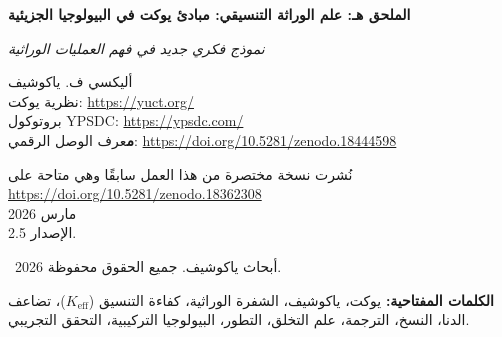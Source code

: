 \documentclass[11pt,a4paper]{article}
\begin{document}
	
	\begin{titlepage}
		\begin{center}
			\vspace*{0cm}
			
			\Huge\textbf{الملحق هـ: علم الوراثة التنسيقي: مبادئ يوكت في البيولوجيا الجزيئية}
			
			\vspace{1cm}
			
			\small\textit{نموذج فكري جديد في فهم العمليات الوراثية}
			
			\vspace{1cm}
			\Large
			أليكسي ف. ياكوشيف\\
			
			نظرية يوكت: \url{https://yuct.org/}\\
			بروتوكول YPSDC: \url{https://ypsdc.com/}\\
			
			\vspace{2cm}
			\textbf معرف الوصل الرقمي: \url{https://doi.org/10.5281/zenodo.18444598}\\
			
			\vspace{1cm}
			
			\large 
			نُشرت نسخة مختصرة من هذا العمل سابقًا وهي متاحة على\\ \url{https://doi.org/10.5281/zenodo.18362308}\\
			\vspace{1cm}
			مارس 2026 \\ \large الإصدار 2.5.
			
			\vspace{4cm}
			\textcopyright~2026 أبحاث ياكوشيف. جميع الحقوق محفوظة.
			
			\newpage	
			\begin{abstract}
				\noindent
				يقدم هذا العمل إعادة تفكير جذرية في العمليات الوراثية من خلال عدسة مبادئ التنسيق عند ياكوشيف. نوضح أن الشفرة الوراثية، وتضاعف الدنا، والتعبير الجيني، والتطور تمثل عمليات تنسيق ذات كفاءة قابلة للقياس \(K_{\text{eff}}\). نقدم نماذج رياضية جديدة تتنبأ بظواهر لم تُفسر سابقًا وتفتح مسارات نحو تطور قابل للبرمجة. تقدم النظرية تنبؤات قابلة للاختبار عبر مجالات تجريبية متعددة، من الاختبارات المعملية البسيطة إلى مشاريع الهندسة الوراثية المعقدة.
			\end{abstract}
			
			\vspace{0cm}
			
			\noindent
			\textbf{الكلمات المفتاحية:} يوكت، ياكوشيف، الشفرة الوراثية، كفاءة التنسيق (\(K_{\text{eff}}\))، تضاعف الدنا، النسخ، الترجمة، علم التخلق، التطور، البيولوجيا التركيبية، التحقق التجريبي.
			
			\vspace{0.5cm}
			
		\end{center}
	\end{titlepage}
	
\end{document}
